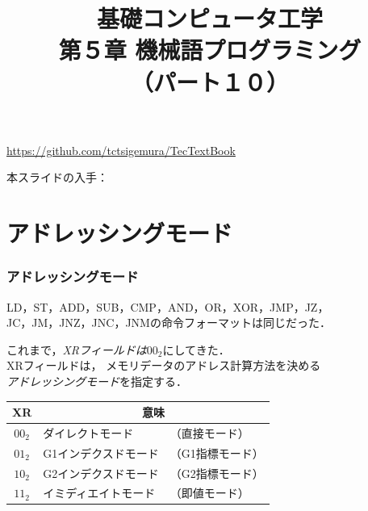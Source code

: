 \documentclass[handout]{beamer}        %
\begin{document}
\title{基礎コンピュータ工学\\第５章 機械語プログラミング\\（パート１０）}
\date{}

\begin{frame}
  \titlepage
  \centerline{\url{https://github.com/tctsigemura/TecTextBook}}
  \vfill
  \centerline{本スライドの入手：
    }
\end{frame}


\section{アドレッシングモード}
\begin{frame}
  \frametitle{アドレッシングモード}
  LD，ST，ADD，SUB，CMP，AND，OR，XOR，JMP，JZ，\\
  JC，JM，JNZ，JNC，JNMの命令フォーマットは同じだった．
  \twoByte{\OP}{\GR~\XR}{\A}

  これまで，\emph{XRフィールドは$00_2$}にしてきた．\\
  XRフィールドは，
  メモリデータのアドレス計算方法を決める\\
  \emph{アドレッシングモード}を指定する．\\

  {\small\begin{center}
    \begin{tabular}{c|l l}
      \hline
      \hline
      XR & \multicolumn{2}{|c}{意味} \\
      \hline
      $00_2$ & ダイレクトモード     & （直接モード）   \\
      $01_2$ & G1インデクスドモード & （G1指標モード） \\
      $10_2$ & G2インデクスドモード & （G2指標モード） \\
      $11_2$ & イミディエイトモード & （即値モード）   \\
    \end{tabular}
  \end{center}}
  \vfill
  \vfill
\end{frame}
\end{document}
